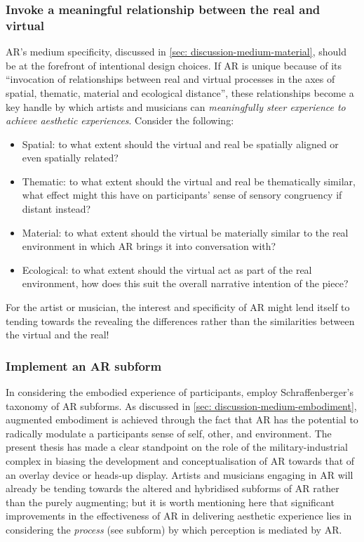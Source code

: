 \subsubsection{Invoke a meaningful relationship between the real and virtual}
AR's medium specificity, discussed in \autoref{sec: discussion-medium-material}, should be at the forefront of intentional design choices. If AR is unique because of its ``invocation of relationships between real and virtual processes in the axes of spatial, thematic, material and ecological distance'', these relationships become a key handle by which artists and musicians can \textit{meaningfully steer experience to achieve aesthetic experiences}. Consider the following:
\begin{itemize}
    \item Spatial: to what extent should the virtual and real be spatially aligned or even spatially related?
    \item Thematic: to what extent should the virtual and real be thematically similar, what effect might this have on participants' sense of sensory congruency if distant instead?
    \item Material: to what extent should the virtual be materially similar to the real environment in which AR brings it into conversation with? 
    \item Ecological: to what extent should the virtual act as part of the real environment, how does this suit the overall narrative intention of the piece?
\end{itemize}
For the artist or musician, the interest and specificity of AR might lend itself to tending towards the revealing the differences rather than the similarities between the virtual and the real!

\subsubsection{Implement an AR subform}
In considering the embodied experience of participants, employ Schraffenberger's taxonomy of AR subforms. As discussed in \autoref{sec: discussion-medium-embodiment}, augmented embodiment is achieved through the fact that AR has the potential to radically modulate a participants sense of self, other, and environment. The present thesis has made a clear standpoint on the role of the military-industrial complex in biasing the development and conceptualisation of AR towards that of an overlay device or heads-up display. Artists and musicians engaging in AR will already be tending towards the altered and hybridised subforms of AR rather than the purely augmenting; but it is worth mentioning here that significant improvements in the effectiveness of AR in delivering aesthetic experience lies in considering the \textit{process} (see subform) by which perception is mediated by AR.

